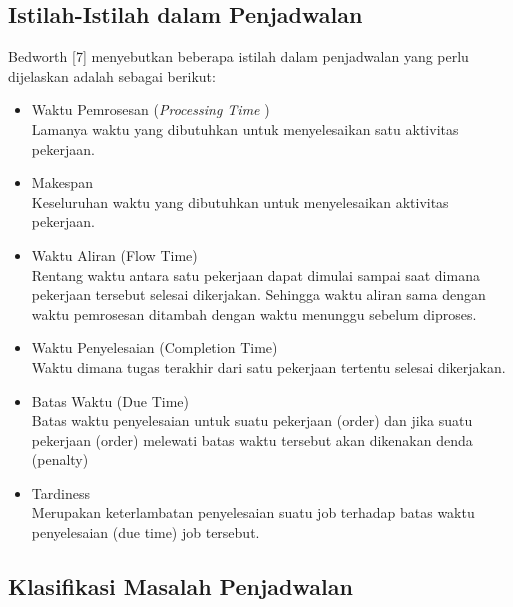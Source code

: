 \subsection{Istilah-Istilah dalam Penjadwalan}
Bedworth [7] menyebutkan beberapa istilah dalam penjadwalan yang perlu dijelaskan adalah sebagai berikut:
 \begin{itemize}
 	\item Waktu Pemrosesan ({\it Processing Time }) \\
 	Lamanya waktu yang dibutuhkan untuk menyelesaikan satu aktivitas pekerjaan.
 	\item Makespan \\
 	Keseluruhan waktu yang dibutuhkan untuk menyelesaikan aktivitas pekerjaan.
 	\item Waktu Aliran (Flow Time) \\
 	Rentang waktu antara satu pekerjaan dapat dimulai sampai saat dimana pekerjaan tersebut selesai dikerjakan. Sehingga waktu aliran sama dengan waktu pemrosesan ditambah dengan waktu menunggu sebelum diproses.
	\item Waktu Penyelesaian (Completion Time)\\
	Waktu dimana tugas terakhir dari satu pekerjaan tertentu selesai dikerjakan.
	\item Batas Waktu (Due Time)\\
	Batas waktu penyelesaian untuk suatu pekerjaan (order) dan jika suatu pekerjaan (order)
	melewati batas waktu tersebut akan dikenakan denda (penalty)
	\item Tardiness \\
	Merupakan keterlambatan penyelesaian suatu job  terhadap batas waktu penyelesaian (due time) job tersebut.
 	
 \end{itemize}

\subsection{Klasifikasi Masalah Penjadwalan}

